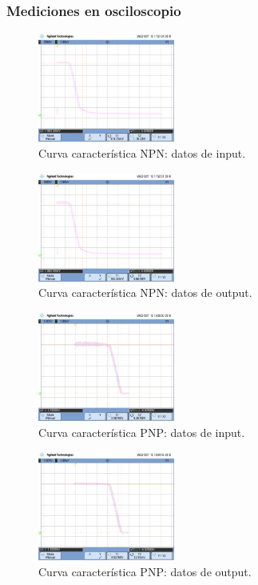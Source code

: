 \subsubsection*{Mediciones en osciloscopio}
\newpage
\begin{multicols}{2}

\begin{figure}[H]
  \centering
    \includegraphics[width=0.4\textwidth]{ejercicio1/scope_x_Punto1_NPN}
    \caption{Curva caracter\'istica NPN: datos de input.} %
\end{figure}

\begin{figure}[H]
  \centering
    \includegraphics[width=0.4\textwidth]{ejercicio1/scope_y_Punto1_NPN}
    \caption{Curva caracter\'istica NPN: datos de output.} %
\end{figure}

\begin{figure}[H]
  \centering
    \includegraphics[width=0.4\textwidth]{ejercicio1/scope_x_Punto1_PNP}
    \caption{Curva caracter\'istica PNP: datos de input.} %
\end{figure}

\begin{figure}[H]
  \centering
    \includegraphics[width=0.4\textwidth]{ejercicio1/scope_y_Punto1_PNP}
    \caption{Curva caracter\'istica PNP: datos de output.} %
\end{figure}


\end{multicols}
